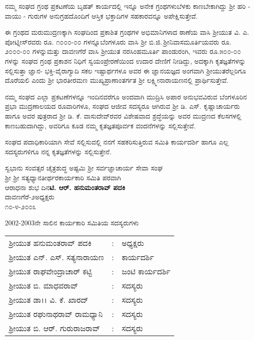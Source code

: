 ನಮ್ಮ ಸಂಘದ ಗ್ರಂಥ ಪ್ರಕಟಣೆಯ ಬೃಹತ್ ಕಾರ್ಯದಲ್ಲಿ ಇನ್ನೂ ಅನೇಕ ಗ್ರಂಥಗಳು\break ಬೆಳಕು ಕಾಣಬೇಕಾಗಿದ್ದು ಶ‍್ರೀ ಹರಿ - ವಾಯು - ಗುರುಗಳ ಅನುಗ್ರಹದೊಂದಿಗೆ ಆಸ್ತಿಕ ಭಕ್ತಾದಿಗಳ ಸಹಕಾರವನ್ನೂ ಅಪೇಕ್ಷಿಸುತ್ತೇವೆ.

ಈ ಗ್ರಂಥದ ಮರುಮುದ್ರಣಕ್ಕಾಗಿ ಸಂಘದಿಂದ ಪ್ರಕಾಶಿತ ಗ್ರಂಥಗಳ ಅಭಿಮಾನಿಗಳಾದ ಠಾಣೆಯ ವಾಸಿ ಶ‍್ರೀಯುತ ವಿ. ಎ. ಪೋಟ್ನೀಸ್‌ರವರು ರೂ. ೧೦೦೦-೦೦ ಗಳನ್ನೂ\break ಬೆಂಗಳೂರು ವಾಸಿ ಶ‍್ರೀ ಬಿ.ಜಿ.\,ಶ‍್ರೀನಿವಾಸಮೂರ್ತಿಯವರು ರೂ.\,೨೦೦೦-೦೦ ಗಳನ್ನು\break ಮತ್ತು ದಾವಣಗೆರೆ ವಾಸಿ ಶ‍್ರೀಯುತ ನರಸಿಂಹಮೂರ್ತಿ ಪಾಂಡುರಂಗಿ, ಇವರು ರೂ.\break ೫೦೦-೦೦ ಗಳನ್ನು ಸಂಘದ ಗ್ರಂಥ ಪ್ರಕಾಶನ ನಿಧಿಗೆ ಸ್ವಯಂಪ್ರೇರಣೆಯಿಂದ ಉದಾರ ದೇಣಿಗೆ ನೀಡಿದ್ದು, ಅದಕ್ಕಾಗಿ ಕೃತಜ್ಞತೆಗಳನ್ನು ಸಲ್ಲಿಸುತ್ತಾ ಜ್ಞಾನ- ಭಕ್ತಿ-ವೈರಾಗ್ಯಾದಿ ಸಕಲ ಇಷ್ಟಾರ್ಥ\-ಗಳೂ ಅವರ ಈ ಜ್ಞಾನಯಜ್ಞದ ಅಂಗವಾಗಿ ಶ‍್ರೀಯುತರೆಲ್ಲರಿಗೂ ದೊರೆಯಲಿ ಎಂದು ಶ‍್ರೀ ಭಾರತೀರಮಣ ಮುಖ್ಯಪ್ರಾಣಾಂತರ್ಗತ ಶ‍್ರೀ ಲಕ್ಷ್ಮೀನಾರಾಯಣನಲ್ಲಿ ಪ್ರಾರ್ಥಿಸು\-ತ್ತೇವೆ.

ನಮ್ಮ ಸಂಘದ ಎಲ್ಲಾ ಪ್ರಕಟಣೆಗಳನ್ನೂ ಇಂದಿನವರೆಗೂ ಅಂದವಾಗಿ ಮುದ್ರಿಸಿ ಅಪಾರ ಅನುಭವವಿರುವ ಬೆಂಗಳೂರಿನ ಪ್ರಭಾ ಮುದ್ರಣಾಲಯದ ರೂವಾರಿಗಳೂ, ಸಂಘದ ಆಜೀವ ಸದಸ್ಯರೂ ಆಗಿರುವ ಶ‍್ರೀ ಡಿ. ಎಸ್. ಕೃಷ್ಣಾಚಾರ್ಯರು ಹಾಗೂ ಅವರ ಪುತ್ರರಾದ ಶ‍್ರೀ ಡಿ. ಕೆ. ವಾಸುದೇವ್‌ರವರ ವಿಶೇಷವಾದ ಶ್ರದ್ಧೆಯನ್ನು ಅವರ ಮುದ್ರಣದ ಕೆಲಸಗಳಲ್ಲಿ ಕಾಣಬಹುದಾಗಿದ್ದು, ಅವರಿಗೂ ಕೂಡ ನಮ್ಮ ಕೃತಜ್ಞತಪೂರ್ವಕ ವಂದನೆಗಳನ್ನು ಸಲ್ಲಿಸುತ್ತೇವೆ.

ಸಂಘದ ಪದಾಧಿಕಾರಿಯಾಗಿ ಸೇವೆ ಸಲ್ಲಿಸುವಲ್ಲಿ ನನಗೆ ಸಹಕರಿಸುತ್ತಿರುವ ಸಮಿತಿ ಕಾರ್ಯದರ್ಶಿ ಹಾಗೂ ಎಲ್ಲ ಸದಸ್ಯರುಗಳಿಗೂ ನನ್ನ ಕೃತಜ್ಞತೆಗಳನ್ನು ಸಲ್ಲಿಸುತ್ತೇನೆ.

\vskip 1cm

\noindent
ಸ್ವಭಾನು ಸಂವತ್ಸರ ಚೈತ್ರಶುದ್ಧ ಅಷ್ಟಮಿ \hfill ಶ‍್ರೀ ಸರ್ವಜ್ಞಾಚಾರ್ಯ ಸೇವಾ ಸಂಘ\\ ಶ‍್ರೀ ಶ‍್ರೀ ಸತ್ಯಧ್ಯಾನತೀರ್ಥರ\hfill ಕಾರ್ಯಕಾರಿ ಸಮಿತಿ ಪರವಾಗಿ\\ ಆರಾಧನಾ ಶುಭ ದಿನ\hfill \textbf{ಟಿ. ಆರ್. ಹನುಮಂತರಾವ್ ಪದಕಿ}\\ ದಾವಣಗೆರೆ-೨\hfill ಅಧ್ಯಕ್ಷರು\\ ೧೦-೪-೨೦೦೩

\vskip 1.5cm

\begin{center}
2002-2003ನೇ ಸಾಲಿನ ಕಾರ್ಯಕಾರಿ ಸಮಿತಿಯ ಸದಸ್ಯರುಗಳು
\end{center}

\begin{longtable}{lcl}
ಶ್ರೀಯುತ ಹನುಮಂತರಾವ್ ಪದಕಿ & : & ಅಧ್ಯಕ್ಷರು \\
ಶ್ರೀಯುತ ಎನ್. ಎಸ್. ಸತ್ಯನಾರಾಯಣ & : & ಕಾರ್ಯದರ್ಶಿ \\
ಶ್ರೀಯುತ ರಾಘವೇಂದ್ರಾಚಾರ್ ಕಟ್ಟಿ & : & ಜಂಟಿ ಕಾರ್ಯದರ್ಶಿ \\
ಶ್ರೀಯುತ ಬಿ. ಮಾಧವರಾವ್ & : & ಸದಸ್ಯರು \\
ಶ್ರೀಯುತ ಡಾ।। ವಿ. ಕೆ. ಖಾರದ್ & : & ಸದಸ್ಯರು \\
ಶ್ರೀಯುತ ರಘುನಾಥರಾವ್ ರಾಮಧ್ಯಾನಿ & : & ಸದಸ್ಯರು \\
ಶ್ರೀಯುತ ಬಿ. ಆರ್. ಗುರುರಾಜರಾವ್ & : & ಸದಸ್ಯರು \\
\end{longtable}

